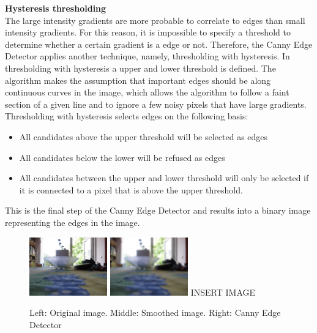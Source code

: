 \documentclass[a4paper]{article}
\begin{document}
\noindent\textbf{Hysteresis thresholding}\\
The large intensity gradients are more probable to correlate to edges than small intensity gradients. For this reason, it is impossible to specify a threshold to determine whether a certain gradient is a edge or not. Therefore, the Canny Edge Detector applies another technique, namely, thresholding with hysteresis. In thresholding with hysteresis a upper and lower threshold is defined. The algorithm makes the assumption that important edges should be along continuous curves in the image, which allows the algorithm to follow a faint section of a given line and to ignore a few noisy pixels that have large gradients. Thresholding with hysteresis selects edges on the following basis:
\begin{itemize}
\item All candidates above the upper threshold will be selected as edges
\item All candidates below the lower will be refused as edges
\item All candidates between the upper and lower threshold will only be selected if it is connected to a pixel that is above the upper threshold.
\end{itemize}
This is the final step of the Canny Edge Detector and results into a binary image representing the edges in the image.

\begin{figure}[!ht]
\centering
\includegraphics[width=0.3\textwidth]{images/gauss_orig.jpg}
\includegraphics[width=0.3\textwidth]{images/gauss_21.png} INSERT IMAGE

\caption{Left: Original image. Middle: Smoothed image. Right: Canny Edge Detector}
\label{canny}
\end{figure}
\end{document}

